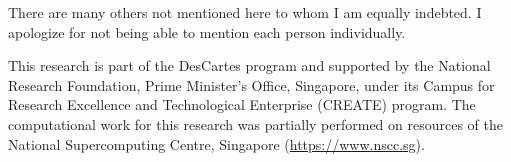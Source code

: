 {%

There are many others not mentioned here to whom I am equally indebted. I apologize for not being able to mention each person individually.

This research is part of the DesCartes program and supported by the National Research Foundation, Prime Minister's Office, Singapore, under its Campus for Research Excellence and Technological Enterprise (CREATE) program. The computational work for this research was partially performed on resources of the National Supercomputing Centre, Singapore (\href{https://www.nscc.sg}{https://www.nscc.sg}).
}
\fi